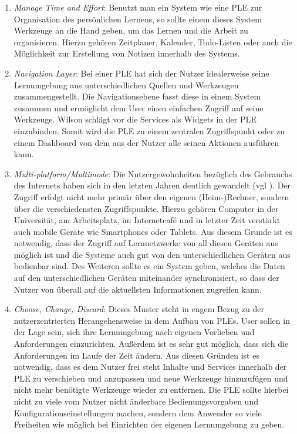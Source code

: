 \begin{enumerate}
 \item \emph{Manage Time and Effort}\label{wilson_patterns:manage_time_effort}: Benutzt man ein System wie eine PLE zur Organisation des persönlichen Lernens, so sollte einem dieses System Werkzeuge an die Hand geben, um das Lernen und die Arbeit zu organisieren. Hierzu gehören Zeitplaner, Kalender, Todo-Listen oder auch die Möglichkeit zur Erstellung von Notizen innerhalb des Systems.
 \item \emph{Navigation Layer}\label{wilson_patterns:navigation_layer}: Bei einer PLE hat sich der Nutzer idealerweise seine Lernumgebung aus unterschiedlichen Quellen und Werkzeugen zusammengestellt. Die Navigationsebene fasst diese in einem System zusammen und ermöglicht dem User einen einfachen Zugriff auf seine Werkzeuge. Wilson schlägt vor die Services als Widgets in der PLE einzubinden. Somit wird die PLE zu einem zentralen Zugriffspunkt oder zu einem Dashboard von dem aus der Nutzer alle seinen Aktionen ausführen kann. 
 \item \emph{Multi-platform/Multimode}\label{wilson_patterns:multimode}: Die Nutzergewohnheiten bezüglich des Gebrauchs des Internets haben sich in den letzten Jahren deutlich gewandelt (vgl \cite{VanHarmelen}). Der Zugriff erfolgt nicht mehr primär über den eigenen (Heim-)Rechner, sondern über die verschiedensten Zugriffspunkte. Hierzu gehören Computer in der Universität, am Arbeitsplatz, im Internetcafé und in letzter Zeit verstärkt auch mobile Geräte wie Smartphones oder Tablets. Aus diesem Grunde ist es notwendig, dass der Zugriff auf Lernnetzwerke von all diesen Geräten aus möglich ist und die Systeme auch gut von den unterschiedlichen Geräten aus bedienbar sind. Des Weiteren sollte es ein System geben, welches die Daten auf den unterschiedlichen Geräten miteinander synchronisiert, so dass der Nutzer von überall auf die aktuellsten Informationen zugreifen kann.
 \item \emph{Choose, Change, Discard}\label{wilson_patterns:choose_change_discard}: Dieses Muster steht in engem Bezug zu der nutzerzentrierten Herangehensweise in dem Aufbau von PLEs. User sollen in der Lage sein, sich ihre Lernumgebung nach eigenen Vorlieben und Anforderungen einzurichten. Außerdem ist es sehr gut möglich, dass sich die Anforderungen im Laufe der Zeit ändern. Aus diesen Gründen ist es notwendig, dass es dem Nutzer frei steht Inhalte und Services innerhalb der PLE zu verschieben und anzupassen und neue Werkzeuge hinzuzufügen und nicht mehr benötigte Werkzeuge wieder zu entfernen. Die PLE sollte hierbei nicht zu viele vom Nutzer nicht änderbare Bedienungsvorgaben und Konfigurationseinstellungen machen, sondern dem Anwender so viele Freiheiten wie möglich bei Einrichten der eigenen Lernumgebung zu geben.
\end{enumerate}


